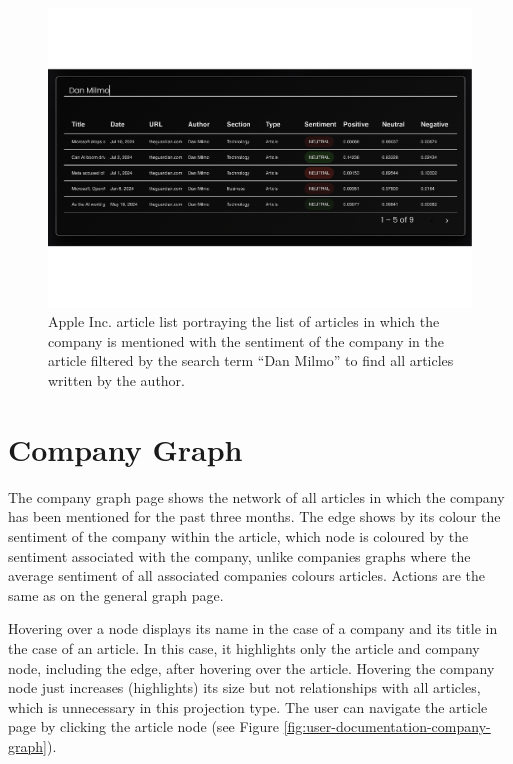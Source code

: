 \begin{figure}[htbp]
    \centering
    \includegraphics[width=\textwidth]{img/user/apple-articles-search-a.pdf}
    \caption{Apple Inc. article list portraying the list of articles in which the company is mentioned with the sentiment of the company in the article filtered by the search term ``Dan Milmo'' to find all articles written by the author.}
    \label{fig:apple-articles-search}
\end{figure}

\section{Company Graph}
\label{sec:user-documentation-company-graph}
The company graph page shows the network of all articles in which the company has been mentioned for the past three months. The edge shows by its colour the sentiment of the company within the article, which node is coloured by the sentiment associated with the company, unlike companies graphs where the average sentiment of all associated companies colours articles. Actions are the same as on the general graph page.

Hovering over a node displays its name in the case of a company and its title in the case of an article. In this case, it highlights only the article and company node, including the edge, after hovering over the article. Hovering the company node just increases (highlights) its size but not relationships with all articles, which is unnecessary in this projection type. The user can navigate the article page by clicking the article node (see Figure \ref{fig:user-documentation-company-graph}).

